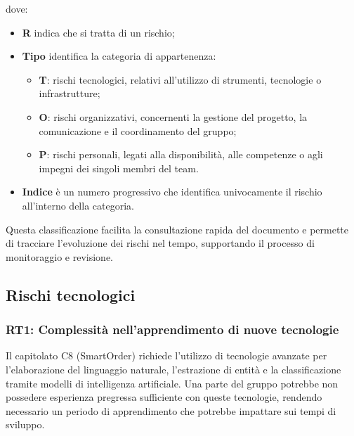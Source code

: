 \documentclass[a4paper, 11pt, oneside]{scrartcl} %
\begin{document}
dove:
\begin{itemize}
    \item \textbf{R} indica che si tratta di un rischio;
    \item \textbf{Tipo} identifica la categoria di appartenenza:
    \begin{itemize}
        \item \textbf{T}: rischi tecnologici, relativi all'utilizzo di strumenti, tecnologie o infrastrutture;
        \item \textbf{O}: rischi organizzativi, concernenti la gestione del progetto, la comunicazione e il coordinamento del gruppo;
        \item \textbf{P}: rischi personali, legati alla disponibilità, alle competenze o agli impegni dei singoli membri del team.
    \end{itemize}
    \item \textbf{Indice} è un numero progressivo che identifica univocamente il rischio all'interno della categoria.
\end{itemize}

Questa classificazione facilita la consultazione rapida del documento e permette di tracciare l'evoluzione dei rischi nel tempo, supportando il processo di monitoraggio e revisione.

\subsection{Rischi tecnologici}

\subsubsection{RT1: Complessità nell'apprendimento di nuove tecnologie}
\label{sec:rt1}

Il capitolato C8 (SmartOrder) richiede l'utilizzo di tecnologie avanzate per l'elaborazione del linguaggio naturale, l'estrazione di entità e la classificazione tramite modelli di intelligenza artificiale. Una parte del gruppo potrebbe non possedere esperienza pregressa sufficiente con queste tecnologie, rendendo necessario un periodo di apprendimento che potrebbe impattare sui tempi di sviluppo.
\end{document}
